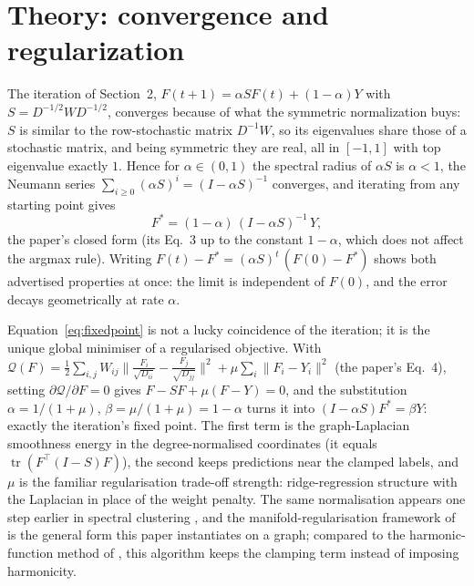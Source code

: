\section{Theory: convergence and regularization}\label{sec:theory}

The iteration of Section~2,
$F(t+1) = \alpha S F(t) + (1-\alpha) Y$ with $S = D^{-1/2} W D^{-1/2}$,
converges because of what the symmetric normalization buys: $S$ is similar to the
row-stochastic matrix $D^{-1}W$, so its eigenvalues share those of a stochastic
matrix, and being symmetric they are real, all in $[-1,1]$ with top eigenvalue
exactly $1$. Hence for $\alpha \in (0,1)$ the spectral radius of $\alpha S$ is
$\alpha < 1$, the Neumann series $\sum_{i\ge 0}(\alpha S)^i = (I - \alpha S)^{-1}$
converges, and iterating from any starting point gives
\begin{equation}
  F^{*} = (1-\alpha)\,(I - \alpha S)^{-1}\, Y ,
  \label{eq:fixedpoint}
\end{equation}
the paper's closed form (its Eq.~3 up to the constant $1-\alpha$, which does not
affect the argmax rule). Writing $F(t) - F^{*} = (\alpha S)^{t}\,(F(0) - F^{*})$
shows both advertised properties at once: the limit is independent of $F(0)$, and
the error decays geometrically at rate $\alpha$.

Equation~\eqref{eq:fixedpoint} is not a lucky coincidence of the iteration; it is
the unique global minimiser of a regularised objective. With
$\mathcal{Q}(F) = \tfrac12 \sum_{i,j} W_{ij}
\bigl\|\tfrac{F_i}{\sqrt{D_{ii}}} - \tfrac{F_j}{\sqrt{D_{jj}}}\bigr\|^{2}
+ \mu \sum_i \|F_i - Y_i\|^{2}$ (the paper's Eq.~4), setting $\partial\mathcal{Q}/\partial F = 0$
gives $F - SF + \mu(F - Y) = 0$, and the substitution $\alpha = 1/(1+ \mu)$,
$\beta = \mu/(1+\mu) = 1-\alpha$ turns it into
$(I - \alpha S) F^{*} = \beta Y$: exactly the iteration's fixed point. The first
term is the graph-Laplacian smoothness energy in the degree-normalised coordinates
(it equals $\operatorname{tr}(F^{\top}(I-S)F)$), the second keeps predictions near
the clamped labels, and $\mu$ is the familiar regularisation trade-off strength:
ridge-regression structure with the Laplacian in place of the weight penalty.
The same normalisation appears one step earlier in spectral clustering
\citep{ng2001spectral}, and the manifold-regularisation framework of
\citet{belkin2004manifold} is the general form this paper instantiates on a graph;
compared to the harmonic-function method of \citet{zhu2003harmonic}, this algorithm
keeps the clamping term instead of imposing harmonicity.

